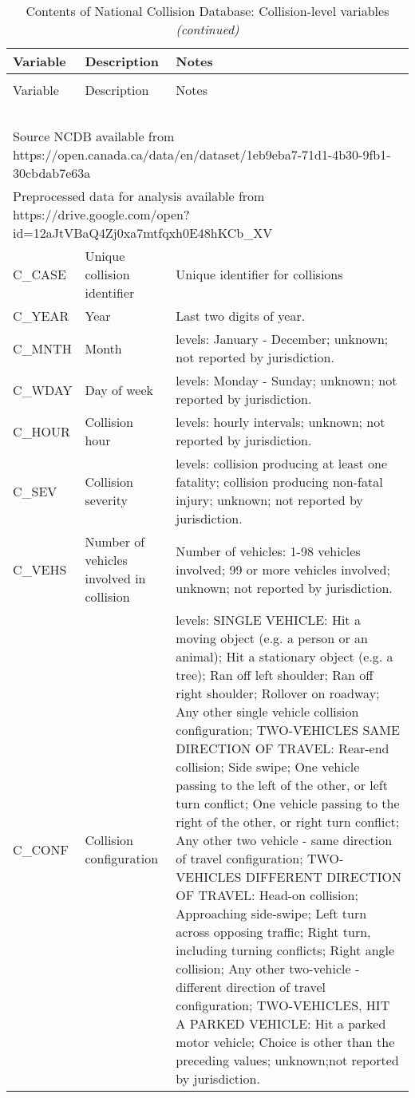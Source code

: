 \documentclass[]{elsarticle} %
\begin{document}
\begin{longtable}[t]{ll>{\raggedright\arraybackslash}p{32em}}
\caption{\label{tab:ncdb-descriptives-collision}\label{tab:ncdb-descriptives-collision}Contents of National Collision Database: Collision-level variables}\\
\toprule
Variable & Description & Notes\\
\midrule
\endfirsthead
\caption[]{\label{tab:ncdb-descriptives-collision}Contents of National Collision Database: Collision-level variables \textit{(continued)}}\\
\toprule
Variable & Description & Notes\\
\midrule
\endhead
\
\endfoot
\bottomrule
\multicolumn{3}{l}{\textit{Note: }}\\
\multicolumn{3}{l}{Source NCDB available from https://open.canada.ca/data/en/dataset/1eb9eba7-71d1-4b30-9fb1-30cbdab7e63a}\\
\multicolumn{3}{l}{Preprocessed data for analysis available from https://drive.google.com/open?id=12aJtVBaQ4Zj0xa7mtfqxh0E48hKCb\_XV}\\
\endlastfoot
\rowcolor{gray!6}  C\_CASE & Unique collision identifier & Unique identifier for collisions\\
C\_YEAR & Year & Last two digits of year.\\
\rowcolor{gray!6}  C\_MNTH & Month & 14 levels: January - December; unknown; not reported by jurisdiction.\\
C\_WDAY & Day of week & 9 levels: Monday - Sunday; unknown; not reported by jurisdiction.\\
\rowcolor{gray!6}  C\_HOUR & Collision hour & 25 levels: hourly intervals; unknown; not reported by jurisdiction.\\
\addlinespace
C\_SEV & Collision severity & 4 levels: collision producing at least one fatality; collision producing non-fatal injury; unknown; not reported by jurisdiction.\\
\rowcolor{gray!6}  C\_VEHS & Number of vehicles involved in collision & Number of vehicles: 1-98 vehicles involved; 99 or more vehicles involved; unknown; not reported by jurisdiction.\\
C\_CONF & Collision configuration & 21 levels: SINGLE VEHICLE: Hit a moving object (e.g. a person or an animal); Hit a stationary object (e.g. a tree); Ran off left shoulder; Ran off right shoulder; Rollover on roadway; Any other single vehicle collision configuration; TWO-VEHICLES SAME DIRECTION OF TRAVEL: Rear-end collision; Side swipe; One vehicle passing to the left of the other, or left turn conflict; One vehicle passing to the right of the other, or right turn conflict; Any other two vehicle - same direction of travel configuration; TWO-VEHICLES DIFFERENT DIRECTION OF TRAVEL: Head-on collision; Approaching side-swipe; Left turn across opposing traffic; Right turn, including turning conflicts; Right angle collision; Any other two-vehicle - different direction of travel configuration; TWO-VEHICLES, HIT A PARKED VEHICLE: Hit a parked motor vehicle; Choice is other than the preceding values; unknown;not reported by jurisdiction.\\

\end{longtable}
\end{document}
